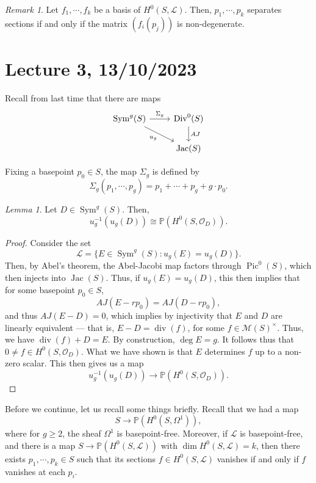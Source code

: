 \documentclass[a4paper]{report}
\theoremstyle{definition}
\theoremstyle{remark}
\newtheorem{remark}{Remark}
\theoremstyle{proposition}
\theoremstyle{conjecture}
\theoremstyle{lemma}
\newtheorem{lemma}{Lemma}
\theoremstyle{corollary}
\theoremstyle{exercise}
\theoremstyle{example}
\newcommand{\mcal}{\mathcal}
\newcommand{\on}{\operatorname}
\begin{document}
\begin{remark}
    Let $f_1,\cdots,f_k$ be a basis of $H^0(S,\mcal{L})$. 
    Then, $p_1,\cdots,p_k$ separates sections if and only if the matrix
    $(f_i(p_j))$ is non-degenerate.
\end{remark}

\section{Lecture 3, 13/10/2023}

Recall from last time that there are maps
$$\begin{tikzcd}
\on{Sym}^g(S) \arrow[r, "\Sigma_g"] \arrow[rd, "u_g"'] & \on{Div}^0(S) \arrow[d, "AJ"] \\
                                           & \on{Jac}(S)                  
\end{tikzcd}$$

Fixing a basepoint $p_0 \in S$, the map $\Sigma_g$ is defined by 
$$\Sigma_g(p_1,\cdots,p_g) = p_1 + \cdots + p_g + g\cdot p_0.$$
\begin{lemma}\label{lem18}
    Let $D \in \on{Sym}^g(S)$. Then, $$u_g^{-1}(u_g(D)) \cong \mathbb{P}(H^0(S,\mcal{O}_D)).$$ 
\end{lemma}

\begin{proof}
    Consider the set 
    $$\mcal{L} = \lbrace E \in \on{Sym}^g(S) : u_g(E) = u_g(D)\rbrace.$$
    Then, by Abel's theorem, the Abel-Jacobi map factors through 
    $\on{Pic}^0(S)$, which then injects into $\on{Jac}(S)$.
    Thus, if $u_g(E) = u_g(D)$, this then implies that for some basepoint
    $p_0 \in S$,
    $$AJ(E-rp_0) = AJ(D-rp_0),$$
    and thus $AJ(E-D) = 0$, which implies by injectivity that 
    $E$ and $D$ are linearly equivalent --- that is, $E-D = \on{div}(f)$,
    for some $f\in \mcal{M}(S)^\times$. Thus, we have
    $\on{div}(f) + D = E$. By construction, $\deg E = g$.
    It follows thus that $0\neq f \in H^0(S,\mcal{O}_D)$. 
    What we have shown is that $E$ determines $f$ up to a non-zero scalar.
    This then gives us a map 
    $$u_g^{-1}(u_g(D)) \longrightarrow \mathbb{P}(H^0(S,\mcal{O}_D)).$$
\end{proof}

Before we continue, let us recall some things briefly. 
Recall that we had a map 
$$S \longrightarrow \mathbb{P}(H^0(S,\Omega^1)),$$
where for $g\geq 2$, the sheaf $\Omega^1$ is basepoint-free.
Moreover, if $\mcal{L}$ is basepoint-free, and there is a map 
$S \to \mathbb{P}(H^0(S,\mcal{L}))$ with $\dim H^0(S,\mcal{L}) = k$, then
there exists $p_1,\cdots,p_k \in S$ such that its sections 
$f\in H^0(S,\mcal{L})$ vanishes if and only if 
$f$ vanishes at each $p_i$.
\end{document}
